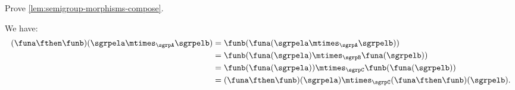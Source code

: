 \begin{exercise}
    Prove \cref{lem:semigroup-morphisms-compose}.
\end{exercise}
\begin{solution}
    We have:
    \begin{equation}
        \begin{aligned}
        (\funa \fthen \funb)(\sgrpela \mtimes_{\sgrpA} \sgrpelb)
            &=\funb(\funa(\sgrpela \mtimes_{\sgrpA} \sgrpelb))\\
            &=\funb(\funa(\sgrpela)\mtimes_{\sgrpB}\funa(\sgrpelb))\\
            &=\funb(\funa(\sgrpela))\mtimes_{\sgrpC} \funb(\funa(\sgrpelb))\\
            &=(\funa \fthen \funb)(\sgrpela) \mtimes_{\sgrpC} (\funa \fthen \funb)(\sgrpelb).
        \end{aligned}
    \end{equation}
\end{solution}
\showslides{
    \begin{forslides}
        \begin{equation}
            \label{eq:sgrp-posreals-mult}
            \tup{\posReals, \cdot}
        \end{equation}
        
        \begin{equation}
            \label{eq:sgrp-reals-plus}
            \tup{\reals, +}
        \end{equation}
    \end{forslides}
}%
